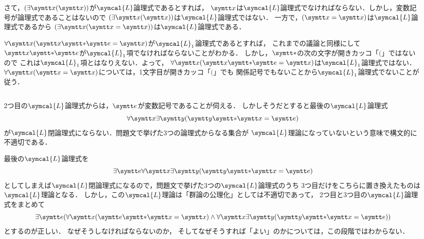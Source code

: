 さて，\(\paren{\apply{\exists \obj{x}}{\obj{x}}}\)が\(\symcal{L}\)論理式であるとすれば，
\(\obj{x}\)は\(\symcal{L}\)論理式でなければならない．しかし，変数記号が論理式であることはないので
\(\paren{\apply{\exists \obj{x}}{\obj{x}}}\)は\(\symcal{L}\)論理式ではない．
一方で，\(\paren{\obj{x} = \obj{x}}\)は\(\symcal{L}\)論理式であるから
\(\paren{\apply{\exists \obj{x}}{\obj{x} = \obj{x}}}\)は\(\symcal{L}\)論理式である．

\(\apply{\forall \obj{x}}{\obj{x} \obj{\ast} \obj{e} = \obj{x}}\)が\(\symcal{L}_1\)論理式であるとすれば，
これまでの議論と同様にして\(\obj{x} \obj{\ast} \obj{e}\)が\(\symcal{L}_1\)項でなければならないことがわかる．
しかし，\(\obj{\ast}\)の次の文字が開きカッコ「\(\lparen\)」ではないので
これは\(\symcal{L}_1\)項とはなりえない．よって，
\(\apply{\forall \obj{x}}{\obj{x} \obj{\ast} \obj{e} = \obj{x}}\)は\(\symcal{L}_1\)論理式ではない．
\(\apply{\forall \obj{x}}{\obj{x} = \obj{x}}\)については，1文字目が開きカッコ「\(\lparen\)」でも
関係記号でもないことから\(\symcal{L}_1\)論理式でないことが従う．

\subsection*{}

2つ目の\(\symcal{L}\)論理式からは，\(\obj{e}\)が変数記号であることが伺える．
しかしそうだとすると最後の\(\symcal{L}\)論理式
\[
	\forall \obj{x} \exists \obj{y} \paren{\obj{y} \obj{\ast} \obj{x} = \obj{e}}
\]
が\(\symcal{L}\)閉論理式にならない．問題文で挙げた3つの論理式からなる集合が
\(\symcal{L}\)理論になっていないという意味で構文的に不適切である．

最後の\(\symcal{L}\)論理式を
\[
	\exists \obj{e} \forall \obj{x} \exists \obj{y} \paren{\obj{y} \obj{\ast} \obj{x} = \obj{e}}
\]
としてしまえば\(\symcal{L}\)閉論理式になるので，問題文で挙げた3つの\(\symcal{L}\)論理式のうち
3つ目だけをこちらに置き換えたものは\(\symcal{L}\)理論となる．
しかし，この\(\symcal{L}\)理論は「群論の公理化」としては不適切であって，
2つ目と3つ目の\(\symcal{L}\)論理式をまとめて
\[
	\exists \obj{e} \paren{
		\forall \obj{x} \paren{\obj{e} \obj{\ast} \obj{x} = \obj{x}}
		\land \forall \obj{x} \exists \obj{y} \paren{\obj{y} \obj{\ast} \obj{x} = \obj{e}}
	}
\]
とするのが正しい．
なぜそうしなければならないのか，
そしてなぜそうすれば「よい」のかについては，この段階ではわからない．

\subsection*{}

